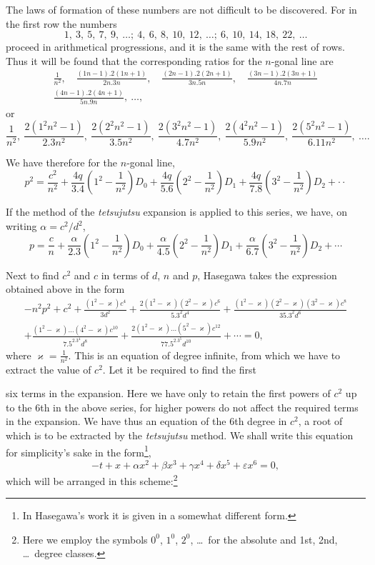 \documentclass[11pt]{article}
\newcommand{\scanpage}[2]{\clearpage\setcounter{footnote}{0}\noindent{\footnotesize\color{gray}PDF page #1 · #2}\par\medskip}
\begin{document}
The laws of formation of these numbers are not difficult to be discovered. For in the first row the numbers
\[
1,\ 3,\ 5,\ 7,\ 9,\ \ldots;\ 4,\ 6,\ 8,\ 10,\ 12,\ \ldots;\ 6,\ 10,\ 14,\ 18,\ 22,\ \ldots
\]
proceed in arithmetical progressions, and it is the same with the rest of rows. Thus it will be found that the corresponding ratios for the $n$-gonal line are
\begin{gather*}
\frac{1}{n^2},\quad \frac{(1n-1).2(1n+1)}{2n.3n},\quad \frac{(2n-1).2(2n+1)}{3n.5n},\quad \frac{(3n-1).2(3n+1)}{4n.7n}\\
\frac{(4n-1).2(4n+1)}{5n.9n},\ \ldots,
\end{gather*}
or
\[
\frac{1}{n^2},\ \frac{2(1^2n^2-1)}{2.3n^2},\ \frac{2(2^2n^2-1)}{3.5n^2},\ \frac{2(3^2n^2-1)}{4.7n^2},\ \frac{2(4^2n^2-1)}{5.9n^2},\ \frac{2(5^2n^2-1)}{6.11n^2},\ \ldots.
\]

We have therefore for the $n$-gonal line,
\[
p^2=\frac{c^2}{n^2}+\frac{4q}{3.4}\left(1^2-\frac{1}{n^2}\right)D_0+\frac{4q}{5.6}\left(2^2-\frac{1}{n^2}\right)D_1+\frac{4q}{7.8}\left(3^2-\frac{1}{n^2}\right)D_2+\cdot\cdot
\]

If the method of the \emph{tetsujutsu} expansion is applied to this series, we have, on writing $\alpha=c^2/d^2$,
\[
p=\frac{c}{n}+\frac{\alpha}{2.3}\left(1^2-\frac{1}{n^2}\right)D_0+\frac{\alpha}{4.5}\left(2^2-\frac{1}{n^2}\right)D_1+\frac{\alpha}{6.7}\left(3^2-\frac{1}{n^2}\right)D_2+\cdots
\]

Next to find $c^2$ and $c$ in terms of $d$, $n$ and $p$, Hasegawa takes the expression obtained above in the form
\begin{multline*}
-n^2p^2+c^2+\frac{(1^2-\varkappa)c^4}{3d^2}+\frac{2(1^2-\varkappa)(2^2-\varkappa)c^6}{5.3^2d^4}+\frac{(1^2-\varkappa)(2^2-\varkappa)(3^2-\varkappa)c^8}{35.3^2d^6}\\
+\frac{(1^2-\varkappa)\ldots(4^2-\varkappa)c^{10}}{7.5^2.3^4d^8}+\frac{2(1^2-\varkappa)\ldots(5^2-\varkappa)c^{12}}{77.5^2.3^5d^{10}}+\cdots=0,
\end{multline*}
where $\varkappa=\frac{1}{n^2}$. This is an equation of degree infinite, from which we have to extract the value of $c^2$. Let it be required to find the first

\scanpage{0295}{printed page 281}
\noindent six terms in the expansion. Here we have only to retain the first powers of $c^2$ up to the 6th in the above series, for higher powers do not affect the required terms in the expansion. We have thus an equation of the 6th degree in $c^2$, a root of which is to be extracted by the \emph{tetsujutsu} method. We shall write this equation for simplicity's sake in the form\footnote{In Hasegawa's work it is given in a somewhat different form.},
\[
-t+x+\alpha x^2+\beta x^3+\gamma x^4+\delta x^5+\varepsilon x^6=0,
\]
which will be arranged in this scheme:\footnote{Here we employ the symbols $0^0$, $1^0$, $2^0$, \dots\ for the absolute and 1st, 2nd, \dots\ degree classes.}
\end{document}

